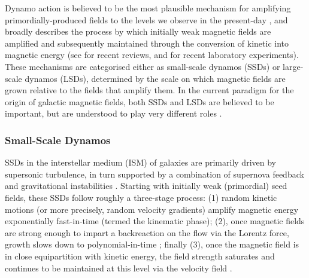 Dynamo action is believed to be the most plausible mechanism for amplifying primordially-produced fields to the levels we observe in the present-day \citep[\eg][]{latif2013small, mtchedlidze2022evolution, mtchedlidze2023inflationary}, and broadly describes the process by which initially weak magnetic fields are amplified and subsequently maintained through the conversion of kinetic into magnetic energy (see \citealt{rincon2019dynamo, brandenburg2023galactic} for recent reviews, and \citealt{tzeferacos2018laboratory, bott2021time, bott2022insensitivity} for recent laboratory experiments). These mechanisms are categorised either as small-scale dynamos (SSDs) or large-scale dynamos (LSDs), determined by the scale on which magnetic fields are grown relative to the fields that amplify them. In the current paradigm for the origin of galactic magnetic fields, both SSDs and LSDs are believed to be important, but are understood to play very different roles \citep[see, \eg][for recent works]{bhat2016unified, pakmor2017magnetic, rieder2017dynamo2, rieder2017dynamo3, steinwandel2023towards, gent2023transition}.

\subsubsection{Small-Scale Dynamos}

SSDs in the interstellar medium (ISM) of galaxies are primarily driven by supersonic turbulence, in turn supported by a combination of supernova feedback and gravitational instabilities \citep{krumholz2016turbulence, bacchini2020evidence}. Starting with initially weak (primordial) seed fields, these SSDs follow roughly a three-stage process: (1) random kinetic motions (or more precisely, random velocity gradients) \citep[\eg][]{vainshtein1972origin, zel1984kinematic, archontis2003numerical} amplify magnetic energy exponentially fast-in-time (termed the kinematic phase); (2), once magnetic fields are strong enough to impart a backreaction on the flow via the Lorentz force, growth slows down to polynomial-in-time \citep[termed the nonlinear phase; \eg][see also \S\ref{sec:discussion:saturation} for a discussion]{schekochihin2004simulations, beresnyak2012universal, Schleicher2013_quadratic_growth, Xu2016_dynamo, seta2020seed}; finally (3), once the magnetic field is in close equipartition with kinetic energy, the field strength saturates and continues to be maintained at this level via the velocity field \citep[\eg][]{schekochihin2002spectra, cho2009growth, seta2021saturation, beattie2022growth}.

